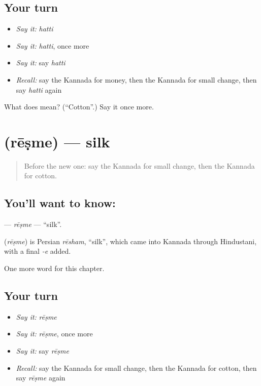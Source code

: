 \subsection*{Your turn}
\begin{itemize}
\raggedright
  \item \emph{Say it:} \emph{hatti}
  \item \emph{Say it:} \emph{hatti}, once more
  \item \emph{Say it:} say \emph{hatti}
  \item \emph{Recall:} say the Kannada for money, then the Kannada for small change, then say \emph{hatti} again
\end{itemize}

\begin{tcolorbox}[breakable,colback=teal!4,colframe=teal!35!black,title={Before you move on}]
What does  mean? (\textquotedblleft{}Cotton\textquotedblright{}.) Say it once more.
\end{tcolorbox}
\section[\texorpdfstring{\kn{ರೇಷ್ಮೆ} (rēṣme)}{ರೇಷ್ಮೆ (rēṣme)}]{ (rēṣme) — silk}

\label{lesson:KA-C295-resme}



\begin{quote}
Before the new one: say the Kannada for small change, then the Kannada for cotton.
\end{quote}

\subsection*{You'll want to know: }
\textbf{} — \emph{rēṣme} — \textquotedblleft{}silk\textquotedblright{}.

\begin{cousinweb}
\textbf{} (\emph{rēṣme}) is Persian \emph{rēsham}, \textquotedblleft{}silk\textquotedblright{}, which came into Kannada through Hindustani, with a final \emph{-e} added.
\end{cousinweb}

\begin{grammarlens}[title={What you've built}]
One more word for this chapter.
\end{grammarlens}

\subsection*{Your turn}
\begin{itemize}
\raggedright
  \item \emph{Say it:} \emph{rēṣme}
  \item \emph{Say it:} \emph{rēṣme}, once more
  \item \emph{Say it:} say \emph{rēṣme}
  \item \emph{Recall:} say the Kannada for small change, then the Kannada for cotton, then say \emph{rēṣme} again
\end{itemize}

